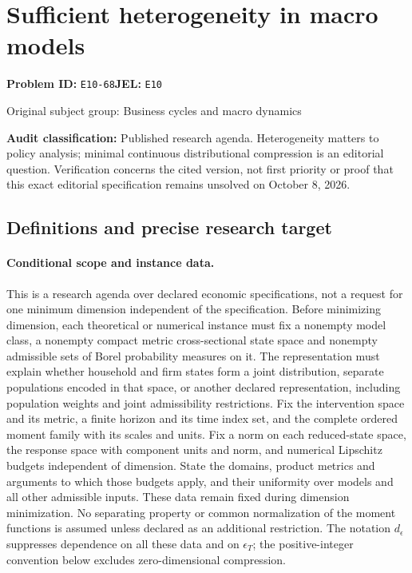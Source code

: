 \documentclass[11pt,a4paper]{article}
\begin{document}
\section*{Sufficient heterogeneity in macro models}
\textbf{Problem ID:} \texttt{E10-68}\quad \textbf{JEL:} \texttt{E10}\par
\label{problem:OP-0234}
{\sffamily\small\color{muted}Original subject group: Business cycles and macro dynamics\par}
\label{definitions:problem:30007515}
\textbf{Audit classification:} Published research agenda. Heterogeneity matters to policy analysis; minimal continuous distributional compression is an editorial question. Verification concerns the cited version, not first priority or proof that this exact editorial specification remains unsolved on October 8, 2026.
\subsection*{Definitions and precise research target}
\paragraph{Conditional scope and instance data.} This is a research agenda over declared economic specifications, not a request for one minimum dimension independent of the specification. Before minimizing dimension, each theoretical or numerical instance must fix a nonempty model class, a nonempty compact metric cross-sectional state space and nonempty admissible sets of Borel probability measures on it. The representation must explain whether household and firm states form a joint distribution, separate populations encoded in that space, or another declared representation, including population weights and joint admissibility restrictions. Fix the intervention space and its metric, a finite horizon and its time index set, and the complete ordered moment family with its scales and units. Fix a norm on each reduced-state space, the response space with component units and norm, and numerical Lipschitz budgets independent of dimension. State the domains, product metrics and arguments to which those budgets apply, and their uniformity over models and all other admissible inputs. These data remain fixed during dimension minimization. No separating property or common normalization of the moment functions is assumed unless declared as an additional restriction. The notation \(d_\epsilon\) suppresses dependence on all these data and on \(\epsilon_T\); the positive-integer convention below excludes zero-dimensional compression.
\end{document}
